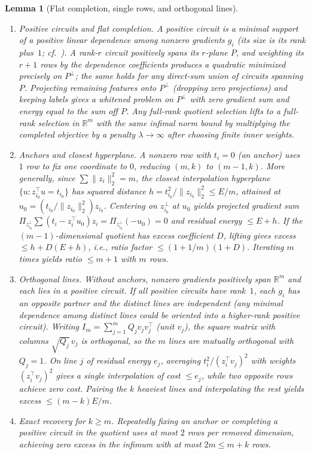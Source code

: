 \documentclass[11pt]{article}
\theoremstyle{plain}
\newtheorem{lemma}[theorem]{Lemma}
\theoremstyle{definition}
\theoremstyle{remark}
\begin{document}
\begin{lemma}[Flat completion, single rows, and orthogonal lines]\label{lem:tools}
\begin{enumerate}[label=\textup{(\arabic*)}]
\item \emph{Positive circuits and flat completion.} A \emph{positive circuit} is a minimal support of a positive linear dependence among nonzero gradients $g_i$ (its size is its rank plus~$1$; cf.~\cite{Steinitz1916,Davis1954}). A rank-$r$ circuit positively spans its $r$-plane $P$, and weighting its $r + 1$ rows by the dependence coefficients produces a quadratic minimized precisely on $P^\perp$; the same holds for any direct-sum union of circuits spanning $P$. Projecting remaining features onto $P^\perp$ (dropping zero projections) and keeping labels gives a whitened problem on $P^\perp$ with zero gradient sum and energy equal to the sum off $P$. Any full-rank quotient selection lifts to a full-rank selection in $\mathbb{R}^m$ with the same infimal norm bound by multiplying the completed objective by a penalty $\lambda \to \infty$ after choosing finite inner weights.
\item \emph{Anchors and closest hyperplane.} A nonzero row with $t_i = 0$ (an \emph{anchor}) uses $1$ row to fix one coordinate to $0$, reducing $(m, k)$ to $(m - 1, k)$. More generally, since $\sum \|z_i\|_2^2 = m$, the closest interpolation hyperplane $\{u : z_{i_0}^\top u = t_{i_0}\}$ has squared distance $h = t_{i_0}^2/\|z_{i_0}\|_2^2 \le E/m$, attained at $u_0 = (t_{i_0}/\|z_{i_0}\|_2^2)z_{i_0}$. Centering on $z_{i_0}^\perp$ at $u_0$ yields projected gradient sum $\Pi_{z_{i_0}^\perp}\sum (t_i - z_i^\top u_0)z_i = \Pi_{z_{i_0}^\perp}(-u_0) = 0$ and residual energy $\le E + h$. If the $(m - 1)$-dimensional quotient has excess coefficient $D$, lifting gives excess $\le h + D(E + h)$, i.e., ratio factor $\le (1 + 1/m)(1 + D)$. Iterating $m$ times yields ratio $\le m + 1$ with $m$ rows.
\item \emph{Orthogonal lines.} Without anchors, nonzero gradients positively span $\mathbb{R}^m$ and each lies in a positive circuit. If all positive circuits have rank~$1$, each $g_i$ has an opposite partner and the distinct lines are independent (any minimal dependence among distinct lines could be oriented into a higher-rank positive circuit). Writing $I_m = \sum_{j=1}^m Q_j v_j v_j^\top$ (unit $v_j$), the square matrix with columns $\sqrt{Q_j}\,v_j$ is orthogonal, so the $m$ lines are mutually orthogonal with $Q_j = 1$. On line $j$ of residual energy $e_j$, averaging $t_i^2/(z_i^\top v_j)^2$ with weights $(z_i^\top v_j)^2$ gives a single interpolation of cost $\le e_j$, while two opposite rows achieve zero cost. Pairing the $k$ heaviest lines and interpolating the rest yields excess $\le (m - k)E/m$.
\item \emph{Exact recovery for $k \ge m$.} Repeatedly fixing an anchor or completing a positive circuit in the quotient uses at most $2$ rows per removed dimension, achieving zero excess in the infimum with at most $2m \le m + k$ rows.
\end{enumerate}
\end{lemma}
\end{document}
